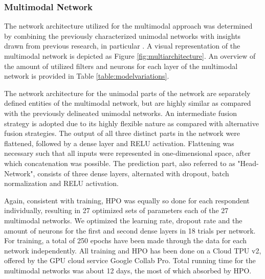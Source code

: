 \documentclass[12pt]{article}
\begin{document}
\subsubsection{Multimodal Network} \label{section:multimodal}
The network architecture utilized for the multimodal approach was determined by combining the previously characterized unimodal networks with insights drawn from previous research, in particular \cite{han2020classification}. A visual representation of the multimodal network is depicted as Figure \ref{fig:multiarchitecture}. An overview of the amount of utilized filters and neurons for each layer of the multimodal network is provided in Table \ref{table:modelvariations}.

The network architecture for the unimodal parts of the network are separately defined entities of the multimodal network, but are highly similar as compared with the previously delineated unimodal networks. An intermediate fusion strategy is adopted due to its highly flexible nature as compared with alternative fusion strategies. The output of all three distinct parts in the network were flattened, followed by a dense layer and RELU activation.  Flattening was necessary such that all inputs were represented in one-dimensional space, after which concatenation was possible. The prediction part, also referred to as "Head-Network", consists of three dense layers, alternated with dropout, batch normalization and RELU activation.  

Again, consistent with training, HPO was equally so done for each respondent individually, resulting in 27 optimized sets of parameters each of the 27 multimodal networks. We optimized the learning rate, dropout rate and the amount of neurons for the first and second dense layers in 18 trials per network.  For training, a total of 250 epochs have been made through the data for each network independently. All training and HPO has been done on a Cloud TPU v2,  offered by the GPU cloud service Google Collab Pro.  Total running time for the multimodal networks was about 12 days, the most of which absorbed by HPO. 
\end{document}
